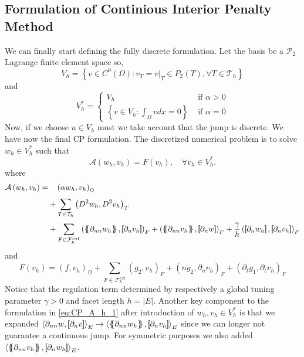 \subsection{Formulation of Continious Interior Penalty Method}%
\label{sub:formulation_of_continious_interior_penalty_method}


We can finally start defining the fully discrete formulation. Let the basis be a $\mathcal{P}_{2} $ Lagrange finite element space so,
\[
V_{h} = \left\{ v \in C^{0}\left( \Omega  \right): v_{T} = v | _{T} \in P_{2}\left( T \right), \forall T \in
\mathcal{T}_{h}    \right\}
\]
and
\[
V_{h}^{*} = \begin{cases}
    V_{h} & \text{ if } \alpha  > 0 \\
    \left\{ v \in V_{h}: \int_{\Omega }^{} v dx   = 0   \right\} &  \text{ if } \alpha   = 0
\end{cases}
\]
Now, if we choose $u \in V_{h}$ must we take account that the jump is discrete.
 We have now the final CP formulation.
The discretized numerical problem is to solve $w_{h} \in V_{h}^{*}$ such that
\begin{equation}
\label{eq:CP_A_F}
\mathcal{A}\left( w_{h}, v_{h} \right)   = F\left( v_{h} \right), \quad \forall v_{h} \in V_{h}^{*}  .
\end{equation}
where
\begin{equation}
\label{eq:CP_A_h_1}
\begin{split}
\mathcal{A} \left( w_{h}, v_{h} \right)   =&
  \quad  \left( \alpha  w_{h}, v_{h} \right) _{\Omega }\\
&  + \sum_{T \in \mathcal{T} _{h}}^{} \left( D^2 w_{h}, D^2v_{h} \right) _{T} \\
 & +
  \sum_{F \in \mathcal{F}_{h}^{int} }^{}
  \left( \mean{  \partial _{n n} w_{h} }, \jump{ \partial _{n }v_{h}} \right)_{F}  +
 \left( \mean{ \partial _{n n} v_{h} }, \jump{ \partial _{n}w }      \right)_{F}
+ \frac{\gamma}{h}  \left( \jump{ \partial _{n} w_{h}}, \jump{ \partial _{n} v_{h}   }   \right)_{F}
\end{split}
\end{equation}
and
\begin{equation}
\label{eq:CP_F_h}
F\left( v_{h} \right)  = \left( f, v_{h} \right) _{\Omega } +  \sum_ {F \in \mathcal{F}_{h} ^{ext}}^{} \left(g_{2 }, v_{h}  \right) _{F}
+ \left(n g_{2}, \partial  _{n}v_{h} \right)_{F} + \left(\partial _{t} g_{1} , \partial _{t}v_{h} \right)_{F}
\end{equation}
Notice that the regulation term determined by respectively a global tuning parameter $\gamma >0 $ and facet length $h = \left\lvert E \right\rvert $. Another key component to the formulation
in \eqref{eq:CP_A_h_1} after introduction of $ w_{h}, v_{h} \in V^{*}_{h}$  is that we expanded $\left< \partial _{nn}w, \jump{ \partial _{n} v }  \right>_{E} \to \left< \mean{ \partial _{nn}w_{h} }  , \jump{ \partial _{n} v_{h} }  \right>_{E} $ since we can longer not guarantee a
continuous jump. For symmetric purposes we also added $ \left< \mean{ \partial _{nn} v_{h}}  , \jump{ \partial _{n} w_{h} }  \right>_{E} $.

